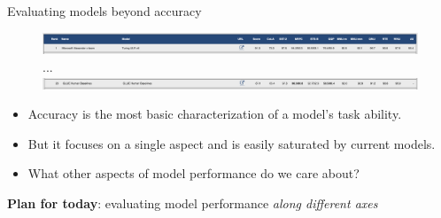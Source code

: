\documentclass[usenames,dvipsnames,notes,11pt,aspectratio=169,hyperref={colorlinks=true, linkcolor=blue}]{beamer}
\begin{document}
\begin{frame}
    {Evaluating models beyond accuracy}

    \begin{figure}
        \includegraphics[width=\textwidth]{figures/glue-top1}\\[1ex]
        ...\\[1ex]
    \includegraphics[width=\textwidth]{figures/glue-human}
    \end{figure}

    \begin{itemize}
        \item Accuracy is the most basic characterization of a model's task ability.
        \item But it focuses on a single aspect and is easily saturated by current models.
        \item What other aspects of model performance do we care about? 
    \end{itemize}
    \pause
    {\bf Plan for today}: evaluating model performance {\it along different axes}
\end{frame}
\end{document}
